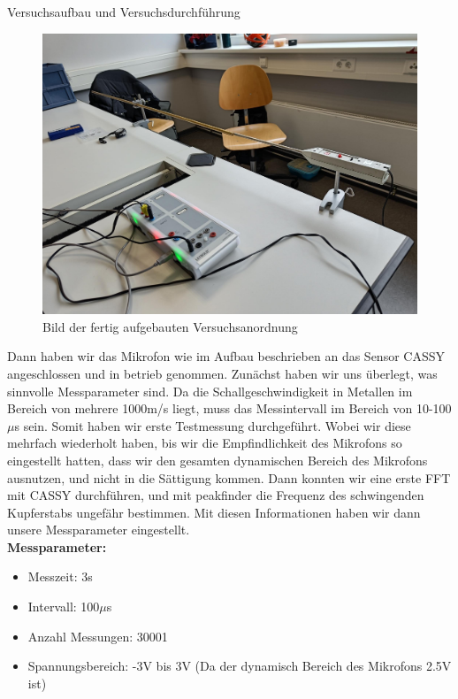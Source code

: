 \documentclass[twoside]{protokoll}
\begin{document}
\begin{aufgabe}{Versuchsaufbau und Versuchsdurchführung}
\begin{figure}[H]
  \centering
  \includegraphics[width=1\textwidth]{Bilder/434170_428396_1A3_Gesamtaufbau.pdf}
  \caption{Bild der fertig aufgebauten Versuchsanordnung}
  \centering
\end{figure}

Dann haben wir das Mikrofon wie im Aufbau beschrieben an das Sensor CASSY angeschlossen und in betrieb genommen. Zunächst haben wir uns überlegt, was sinnvolle Messparameter sind. Da die Schallgeschwindigkeit in Metallen im Bereich von mehrere 1000m/s liegt, muss das Messintervall im Bereich von 10-100$\mu$s sein. Somit haben wir erste Testmessung durchgeführt. Wobei wir diese mehrfach wiederholt haben, bis wir die Empfindlichkeit des Mikrofons so eingestellt hatten, dass wir den gesamten dynamischen Bereich des Mikrofons ausnutzen, und nicht in die Sättigung kommen. Dann konnten wir eine erste FFT mit CASSY durchführen, und mit peakfinder die Frequenz des schwingenden Kupferstabs ungefähr bestimmen. Mit diesen Informationen haben wir dann unsere Messparameter eingestellt.\\

\textbf{Messparameter:}
\begin{itemize}
\item Messzeit: 3s
\item Intervall: 100$\mu$s
\item Anzahl Messungen: 30001
\item Spannungsbereich: -3V bis 3V (Da der dynamisch Bereich des Mikrofons 2.5V ist)
\end{itemize}


\end{aufgabe}
\end{document}
